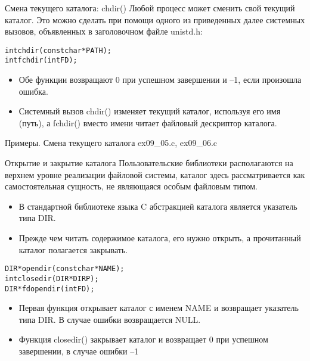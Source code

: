 \documentclass{beamer}
\begin{document}
\begin{frame}[fragile]{Смена текущего каталога: chdir()}
Любой процесс может сменить свой текущий каталог. Это можно сделать при помощи одного из приведенных далее системных вызовов, объявленных в заголовочном файле unistd.h:
\begin{alltt}
int chdir (const char * PATH);
int fchdir (int FD);
\end{alltt}
\begin{itemize}
\item Обе функции возвращают 0 при успешном завершении и –1, если произошла ошибка. 
\item Системный вызов chdir() изменяет текущий каталог, используя его имя (путь),
а fchdir() вместо имени читает файловый дескриптор каталога.
\end{itemize}
\begin{block}{Примеры. Смена текущего каталога}
ex09\_05.c, ex09\_06.c
\end{block}
\end{frame}

\begin{frame}[fragile]{Открытие и закрытие каталога}
Пользовательские библиотеки располагаются на верхнем уровне реализации файловой системы, каталог здесь рассматривается как самостоятельная сущность, не являющаяся особым файловым типом. 
\begin{itemize}
\item В стандартной библиотеке языка C абстракцией каталога является указатель типа DIR. 
\item Прежде чем читать содержимое каталога, его нужно открыть, а прочитанный каталог полагается закрывать.
\end{itemize}
\begin{alltt}
DIR * opendir (const char * NAME);
int closedir (DIR * DIRP);
DIR * fdopendir (int FD);
\end{alltt}
\begin{itemize}
\item Первая функция открывает каталог с именем NAME и возвращает указатель типа DIR. В случае ошибки возвращается NULL. 
\item Функция closedir() закрывает каталог и возвращает 0 при успешном завершении, в случае ошибки –1
\end{itemize}
\end{frame}
\end{document}
